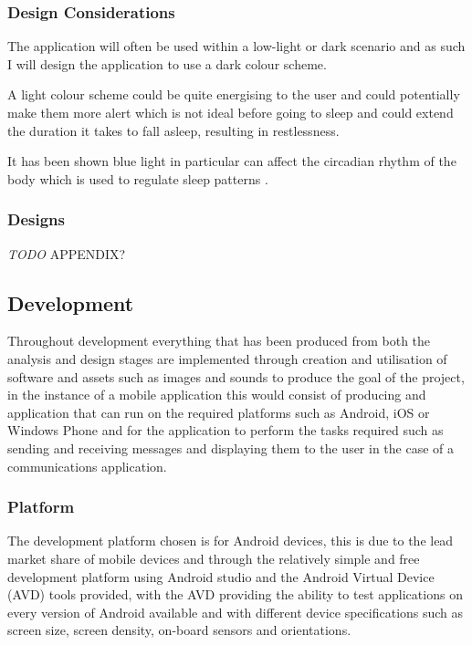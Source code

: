 \subsubsection{Design Considerations}\label{design-considerations}

The application will often be used within a low-light or dark scenario
and as such I will design the application to use a dark colour scheme.

A light colour scheme could be quite energising to the user and could
potentially make them more alert which is not ideal before going to
sleep and could extend the duration it takes to fall asleep, resulting
in restlessness.

It has been shown blue light in particular can affect the circadian
rhythm of the body which is used to regulate sleep patterns
\cite{oh2015analysis}.

\subsubsection{Designs}\label{designs}

\emph{TODO} APPENDIX?

\subsection{Development}\label{development}

Throughout development everything that has been produced from both the
analysis and design stages are implemented through creation and
utilisation of software and assets such as images and sounds to produce
the goal of the project, in the instance of a mobile application this
would consist of producing and application that can run on the required
platforms such as Android, iOS or Windows Phone and for the application
to perform the tasks required such as sending and receiving messages and
displaying them to the user in the case of a communications application.

\subsubsection{Platform}\label{platform}

The development platform chosen is for Android devices, this is due to
the lead market share of mobile devices and through the relatively
simple and free development platform using Android studio and the
Android Virtual Device (AVD) tools provided, with the AVD providing the
ability to test applications on every version of Android available and
with different device specifications such as screen size, screen
density, on-board sensors and orientations.

